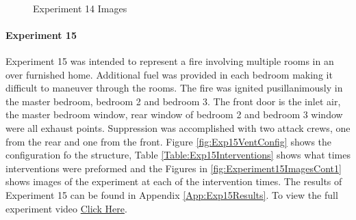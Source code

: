 \documentclass{article}
\begin{document}
\begin{figure}[H]
	\ContinuedFloat 
	\centering 
	 \ 
	\caption{Experiment 14 Images}
	\label{fig:Experiment14ImagesCont3} 
\end{figure}

\paragraph{Experiment 15}\mbox{}

Experiment 15 was intended to represent a fire involving multiple rooms in an over furnished home. Additional fuel was provided in each bedroom making it difficult to maneuver through the rooms. The fire was ignited pusillanimously in the master bedroom, bedroom 2 and bedroom 3. The front door is the inlet air, the master bedroom window, rear window of bedroom 2 and bedroom 3 window were all exhaust points. Suppression was accomplished with two attack crews, one from the rear and one from the front. Figure \ref{fig:Exp15VentConfig} shows the configuration fo the structure, Table \ref{Table:Exp15Interventions} shows what times interventions were preformed and the Figures in \ref{fig:Experiment15ImagesCont1} shows images of the experiment at each of the intervention times. The results of Experiment 15 can be found in Appendix \ref{App:Exp15Results}. To view the full experiment video \href{https://youtu.be/yoZ9sIg_LEA}{Click Here}.
\end{document}
